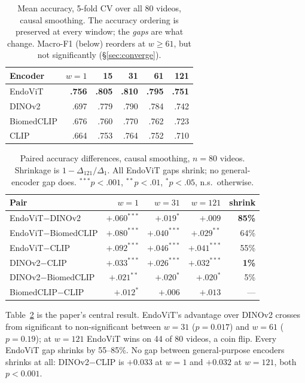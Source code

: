 \documentclass[10pt,twocolumn]{article}
\begin{document}
\begin{table}[t]\centering\footnotesize
\caption{Mean accuracy, 5-fold CV over all 80 videos, causal smoothing.
The accuracy ordering is preserved at every window; the \emph{gaps} are what
change. Macro-F1 (below) reorders at $w\geq61$, but not significantly
(\S\ref{sec:converge}).}
\label{tab:acc}
\begin{tabular}{@{}lrrrrr@{}}
\toprule
Encoder & $w{=}1$ & 15 & 31 & 61 & 121 \\
\midrule
EndoViT    & \bf.756 & \bf.805 & \bf.810 & \bf.795 & \bf.751 \\
DINOv2     & .697 & .779 & .790 & .784 & .742 \\
BiomedCLIP & .676 & .760 & .770 & .762 & .723 \\
CLIP       & .664 & .753 & .764 & .752 & .710 \\
\bottomrule
\end{tabular}
\end{table}

\begin{table}[t]\centering\footnotesize
\caption{Paired accuracy differences, causal smoothing, $n=80$ videos.
Shrinkage is $1-\Delta_{121}/\Delta_{1}$. All EndoViT gaps shrink; no
general-encoder gap does.
$^{***}p{<}.001$, $^{**}p{<}.01$, $^{*}p{<}.05$, n.s.\ otherwise.}
\label{tab:paired}
\begin{tabular}{@{}lrrrr@{}}
\toprule
Pair & $w{=}1$ & $w{=}31$ & $w{=}121$ & shrink \\
\midrule
EndoViT$-$DINOv2     & $+.060^{***}$ & $+.019^{*}$   & $+.009$       & \bf85\% \\
EndoViT$-$BiomedCLIP & $+.080^{***}$ & $+.040^{***}$ & $+.029^{**}$  & 64\% \\
EndoViT$-$CLIP       & $+.092^{***}$ & $+.046^{***}$ & $+.041^{***}$ & 55\% \\
DINOv2$-$CLIP        & $+.033^{***}$ & $+.026^{***}$ & $+.032^{***}$ & \bf1\% \\
DINOv2$-$BiomedCLIP  & $+.021^{**}$  & $+.020^{*}$   & $+.020^{*}$   & 5\% \\
BiomedCLIP$-$CLIP    & $+.012^{*}$   & $+.006$       & $+.013$       & --- \\
\bottomrule
\end{tabular}
\end{table}

Table~\ref{tab:paired} is the paper's central result. EndoViT's advantage over
DINOv2 crosses from significant to non-significant between $w=31$ ($p=0.017$)
and $w=61$ ($p=0.19$); at $w=121$ EndoViT wins on 44 of 80 videos, a coin flip.
Every EndoViT gap shrinks by 55--85\%. No gap between general-purpose encoders
shrinks at all: DINOv2$-$CLIP is $+0.033$ at $w=1$ and $+0.032$ at $w=121$, both
$p<0.001$.
\end{document}
